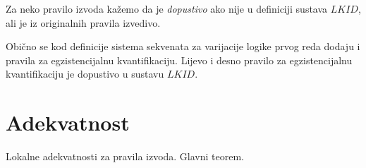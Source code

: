 Za neko pravilo izvoda kažemo da je \textit{dopustivo} ako nije u definiciji sustava \(\mathit{LKID}\),
ali je iz originalnih pravila izvedivo.
\begin{example}
  Obično se kod definicije sistema sekvenata za varijacije logike prvog reda dodaju i pravila za egzistencijalnu kvantifikaciju.
  Lijevo i desno pravilo za egzistencijalnu kvantifikaciju je dopustivo u sustavu \(\mathit{LKID}\).
\end{example}

\section{Adekvatnost}\label{sec:adekvatnost}
Lokalne adekvatnosti za pravila izvoda. Glavni teorem.

